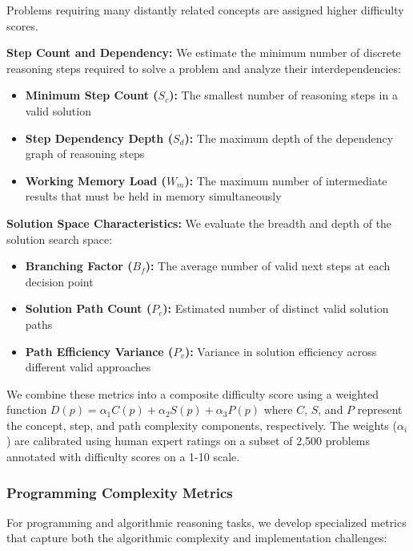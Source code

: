 Problems requiring many distantly related concepts are assigned higher difficulty scores.

\textbf{Step Count and Dependency:} We estimate the minimum number of discrete reasoning steps required to solve a problem and analyze their interdependencies:

\begin{itemize}
    \item \textbf{Minimum Step Count ($S_c$):} The smallest number of reasoning steps in a valid solution
    \item \textbf{Step Dependency Depth ($S_d$):} The maximum depth of the dependency graph of reasoning steps
    \item \textbf{Working Memory Load ($W_m$):} The maximum number of intermediate results that must be held in memory simultaneously
\end{itemize}

\textbf{Solution Space Characteristics:} We evaluate the breadth and depth of the solution search space:

\begin{itemize}
    \item \textbf{Branching Factor ($B_f$):} The average number of valid next steps at each decision point
    \item \textbf{Solution Path Count ($P_c$):} Estimated number of distinct valid solution paths
    \item \textbf{Path Efficiency Variance ($P_v$):} Variance in solution efficiency across different valid approaches
\end{itemize}

We combine these metrics into a composite difficulty score using a weighted function $D(p) = \alpha_1 C(p) + \alpha_2 S(p) + \alpha_3 P(p)$ where $C$, $S$, and $P$ represent the concept, step, and path complexity components, respectively. The weights ($\alpha_i$) are calibrated using human expert ratings on a subset of 2,500 problems annotated with difficulty scores on a 1-10 scale.

\subsubsection{Programming Complexity Metrics}

For programming and algorithmic reasoning tasks, we develop specialized metrics that capture both the algorithmic complexity and implementation challenges:

